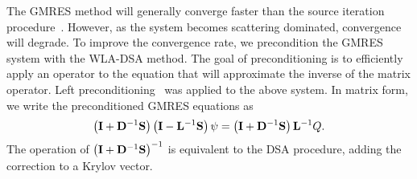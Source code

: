 The GMRES method will generally converge faster than the source iteration
procedure~\cite{morel_dsa}.  However, as the system becomes scattering dominated,
convergence will degrade.  To improve the convergence rate, we precondition the GMRES
system with the WLA-DSA method.  The goal of preconditioning is to efficiently apply an
operator to the equation that will approximate the inverse of the matrix operator. Left
preconditioning~\cite{saad} was applied to the above system.  In matrix form, we write the preconditioned GMRES equations as
\begin{equation}
    \left(\mathbf{I} + \mathbf{D}^{-1} \mathbf{S}\right)\left(\mathbf{I} - \mathbf{L}^{-1} \mathbf{S} \right) \psi = \left( \mathbf{I} + \mathbf{D}^{-1}\mathbf{S}\right) \mathbf{L}^{-1} Q.
\end{equation}
The operation of $\left(\mathbf{I} + \mathbf{D}^{-1} \mathbf{S}\right)^{-1}$ is equivalent to the DSA
procedure, adding the correction to a Krylov vector.

